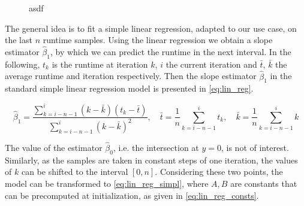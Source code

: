  
 \begin{figure}[htpb]
 	\centering
 	\caption{asdf}
 	\label{fig:split_vs_regression}
 \end{figure}




The general idea is to fit a simple linear regression, adapted to our use case, on the last $n$ runtime samples. Using the linear regression we obtain a slope estimator $\hat{\beta}_1$, by which we can predict the runtime in the next interval. In the following, $t_k$ is the runtime at iteration $k$, $i$ the current iteration and $\bar t$, $\bar k$ the average runtime and iteration respectively. Then the slope estimator $\hat{\beta}_1$ in the standard simple linear regression model is presented in \eqref{eq:lin_reg}.
 

\begin{equation}
	\hat{\beta}_1=\frac{\sum_{k=i-n-1}^{i}(k-\bar k)(t_k-\bar t)}{\sum_{k=i-n-1}^{i}(k-\bar k)^2},\quad\bar t=\frac{1}{n}\sum_{k=i-n-1}^it_k, \quad \bar k = \frac{1}{n}\sum_{k=i-n-1}^ik\label{eq:lin_reg}
\end{equation}

The value of the estimator $\hat\beta_0$, i.e. the intersection at $y=0$, is not of interest. Similarly, as the samples are taken in constant steps of one iteration, the values of $k$ can be shifted to the interval $[0, n]$. Considering these two points, the model can be transformed to \eqref{eq:lin_reg_simpl}, where $A, B$ are constants that can be precomputed at initialization, as given in \eqref{eq:lin_reg_consts}.

